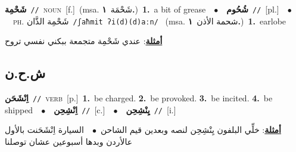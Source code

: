 \documentclass[10pt,a4paper,twoside]{article} %
\begin{document}
\begin{multicols}{2}
{\setlength\topsep{0pt}\textbf{\foreignlanguage{arabic}{شَحْمِة}}\ {\color{gray}\texttt{//}\color{black}}\ \textsc{noun}\ [f.]\ \color{gray}(msa. \foreignlanguage{arabic}{شَحْمَة}~\foreignlanguage{arabic}{\textbf{١.}})\color{black}\ \textbf{1.}~a bit of grease\ \ $\bullet$\ \ \setlength\topsep{0pt}\textbf{\foreignlanguage{arabic}{شُحُوم}}\ {\color{gray}\texttt{//}\color{black}}\ [pl.]\ \ $\bullet$\ \ \textsc{ph.} \color{gray} \foreignlanguage{arabic}{شَحْمِة الذَّان}\color{black}\ {\color{gray}\texttt{/{\sffamily ʃaħmit ʔi(d)(d)aːn}/}\color{black}}\ \color{gray} (msa. \foreignlanguage{arabic}{شحمة الأذن}~\foreignlanguage{arabic}{\textbf{١.}})\color{black}\ \textbf{1.}~earlobe\  \begin{flushright}\color{gray}\foreignlanguage{arabic}{\textbf{\underline{\foreignlanguage{arabic}{أمثلة}}}: عندي شَحْمِة متجمعة ببكني نفسي تروح}\end{flushright}\color{black}} \vspace{2mm}

\vspace{-3mm}
\subsection*{\color{blue}\foreignlanguage{arabic}{ش.ح.ن}\color{blue}{}} 

{\setlength\topsep{0pt}\textbf{\foreignlanguage{arabic}{اِنْشَحَن}}\ {\color{gray}\texttt{//}\color{black}}\ \textsc{verb}\ [p.]\ \textbf{1.}~be charged.  \textbf{2.}~be provoked.  \textbf{3.}~be incited.  \textbf{4.}~be shipped\ \ $\bullet$\ \ \setlength\topsep{0pt}\textbf{\foreignlanguage{arabic}{اِنْشِحِن}}\ {\color{gray}\texttt{//}\color{black}}\ [c.]\ \ $\bullet$\ \ \setlength\topsep{0pt}\textbf{\foreignlanguage{arabic}{يِنْشِحِن}}\ {\color{gray}\texttt{//}\color{black}}\ [i.]\  \begin{flushright}\color{gray}\foreignlanguage{arabic}{\textbf{\underline{\foreignlanguage{arabic}{أمثلة}}}: خلِّي البلفون يِنْشِحِن لنصه وبعدين قيم الشاحن\ $\bullet$\ \  السيارة اِنْشَحَنت بالأول عالأردن وبدها أسبوعين عشان توصلنا}\end{flushright}\color{black}} \vspace{2mm}


\end{multicols}
\end{document}

